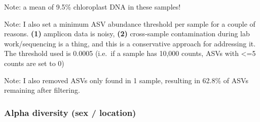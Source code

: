 \documentclass[
  letterpaper,
  DIV=11,
  numbers=noendperiod]{scrartcl}
\begin{document}
Note: a mean of 9.5\% chloroplast DNA in these samples!

Note: I also set a minimum ASV abundance threshold per sample for a
couple of reasons. \textbf{(1)} amplicon data is noisy, \textbf{(2)}
cross-sample contamination during lab work/sequencing is a thing, and
this is a conservative approach for addressing it. The threshold used is
0.0005 (i.e.~if a sample has 10,000 counts, ASVs with \textless=5 counts
are set to 0)

Note: I also removed ASVs only found in 1 sample, resulting in 62.8\% of
ASVs remaining after filtering.

\subsubsection{Alpha diversity (sex /
location)}\label{alpha-diversity-sex-location}
\end{document}
